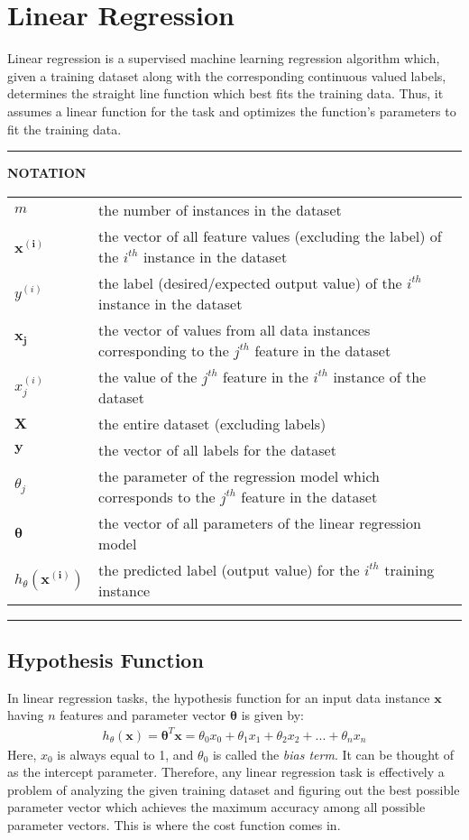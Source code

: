 \documentclass[a4paper, 12pt]{article}
\begin{document}
\section{Linear Regression}
Linear regression is a supervised machine learning regression algorithm which, given a training dataset along with the corresponding continuous valued labels, determines the straight line function which best fits the training data. Thus, it assumes a linear function for the task and optimizes the function's parameters to fit the training data.
\vspace{1cm}
\hrule
\begin{center}
\textbf{NOTATION} \\
[8mm]
\begin{tabular}{p{1.8cm}p{9cm}}
$m$ & the number of instances in the dataset\\
[4mm]
$\bm{x^{\left(i\right)}}$ & the vector of all feature values (excluding the label) of the $i^{th}$ instance in the dataset\\
[4mm]
$y^{\left(i\right)}$ & the label (desired/expected output value) of the $i^{th}$ instance in the dataset \\
[4mm]
$\bm{x_j}$ & the vector of values from all data instances corresponding to the $j^{th}$ feature in the dataset\\
[4mm]
$x^{\left(i\right)}_j$ & the value of the $j^{th}$ feature in the $i^{th}$ instance of the dataset \\
[4mm]
$\bm{X}$ & the entire dataset (excluding labels) \\
[4mm]
$\bm{y}$ & the vector of all labels for the dataset \\
[4mm]
${\theta}_j$ & the parameter of the regression model which corresponds to the $j^{th}$ feature in the dataset \\
[4mm]
$\bm{\theta}$ & the vector of all parameters of the linear regression model \\
[4mm]
$h_{\theta}\left(\bm{x^{\left(i\right)}}\right)$ & the predicted label (output value) for the $i^{th}$ training instance
\end{tabular}
\end{center}
\hrule

\subsection{Hypothesis Function}
In linear regression tasks, the hypothesis function for an input data instance $\bm{x}$ having $n$ features and parameter vector $\bm{\theta}$ is given by:
\begin{align*}
h_{\theta}\left(\bm{x}\right) = \bm{\theta}^T\bm{x} = \theta_0x_0 + \theta_1x_1 + \theta_2x_2 + ... + \theta_nx_n
\end{align*}
Here, $x_0$ is always equal to 1, and $\theta_0$ is called the \textit{bias term}. It can be thought of as the intercept parameter. Therefore, any linear regression task is effectively a problem of analyzing the given training dataset and figuring out the best possible parameter vector which achieves the maximum accuracy among all possible parameter vectors. This is where the cost function comes in.
\end{document}
